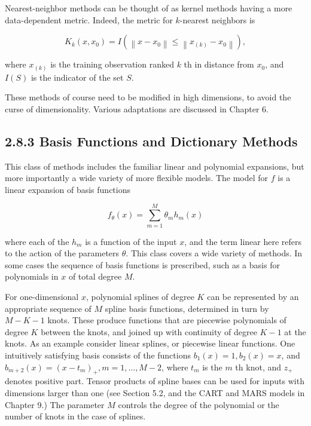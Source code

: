\documentclass[10pt]{article}
\begin{document}
Nearest-neighbor methods can be thought of as kernel methods having a more data-dependent metric. Indeed, the metric for $k$-nearest neighbors is

$$
K_{k}\left(x, x_{0}\right)=I\left(\left\|x-x_{0}\right\| \leq\left\|x_{(k)}-x_{0}\right\|\right),
$$

where $x_{(k)}$ is the training observation ranked $k$ th in distance from $x_{0}$, and $I(S)$ is the indicator of the set $S$.

These methods of course need to be modified in high dimensions, to avoid the curse of dimensionality. Various adaptations are discussed in Chapter 6.

\subsection*{2.8.3 Basis Functions and Dictionary Methods}
This class of methods includes the familiar linear and polynomial expansions, but more importantly a wide variety of more flexible models. The model for $f$ is a linear expansion of basis functions


\begin{equation*}
f_{\theta}(x)=\sum_{m=1}^{M} \theta_{m} h_{m}(x) \tag{2.43}
\end{equation*}


where each of the $h_{m}$ is a function of the input $x$, and the term linear here refers to the action of the parameters $\theta$. This class covers a wide variety of methods. In some cases the sequence of basis functions is prescribed, such as a basis for polynomials in $x$ of total degree $M$.

For one-dimensional $x$, polynomial splines of degree $K$ can be represented by an appropriate sequence of $M$ spline basis functions, determined in turn by $M-K-1$ knots. These produce functions that are piecewise polynomials of degree $K$ between the knots, and joined up with continuity of degree $K-1$ at the knots. As an example consider linear splines, or piecewise linear functions. One intuitively satisfying basis consists of the functions $b_{1}(x)=1, b_{2}(x)=x$, and $b_{m+2}(x)=\left(x-t_{m}\right)_{+}, m=1, \ldots, M-2$, where $t_{m}$ is the $m$ th knot, and $z_{+}$denotes positive part. Tensor products of spline bases can be used for inputs with dimensions larger than one (see Section 5.2, and the CART and MARS models in Chapter 9.) The parameter $M$ controls the degree of the polynomial or the number of knots in the case of splines.
\end{document}
